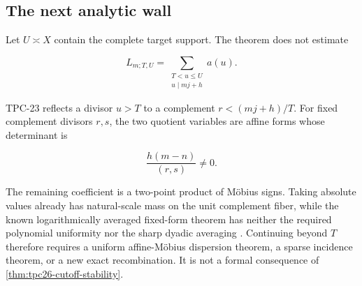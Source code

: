 \subsection{The next analytic wall}

Let \(U\asymp X\) contain the complete target support.  The theorem
does not estimate

\begin{equation}
 L_{m;T,U}
 =\sum_{\substack{T<u\le U\\u\mid mj+h}}a(u).
 \label{eq:tpc26-ultra-long}
\end{equation}

TPC-23 reflects a divisor \(u>T\) to a complement \(r<(mj+h)/T\).
For fixed complement divisors \(r,s\), the two quotient variables are
affine forms whose determinant is

\begin{equation}
 \frac{h(m-n)}{(r,s)}\ne0.
 \label{eq:tpc26-affine-determinant}
\end{equation}

The remaining coefficient is a two-point product of M\"obius signs.
Taking absolute values already has natural-scale mass on the unit
complement fiber, while the known logarithmically averaged fixed-form
theorem has neither the required polynomial uniformity nor the sharp
dyadic averaging \citep{Tao2016,WangTPC23}.  Continuing beyond \(T\)
therefore requires a uniform affine-M\"obius dispersion theorem, a
sparse incidence theorem, or a new exact recombination.  It is not a
formal consequence of \cref{thm:tpc26-cutoff-stability}.
